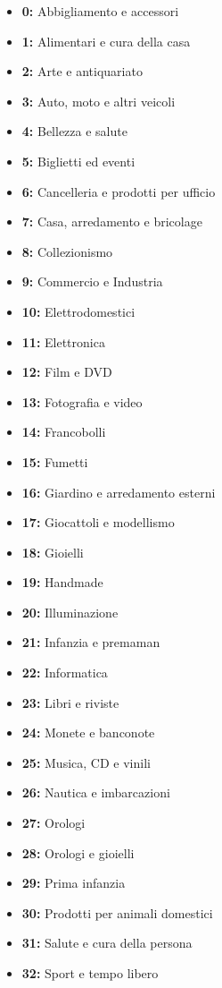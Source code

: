 \begin{itemize}

\item \textbf{0:} Abbigliamento e accessori
\item \textbf{1:} Alimentari e cura della casa
\item \textbf{2:} Arte e antiquariato
\item \textbf{3:} Auto, moto e altri veicoli
\item \textbf{4:} Bellezza e salute
\item \textbf{5:} Biglietti ed eventi
\item \textbf{6:} Cancelleria e prodotti per ufficio
\item \textbf{7:} Casa, arredamento e bricolage
\item \textbf{8:} Collezionismo
\item \textbf{9:} Commercio e Industria
\item \textbf{10:} Elettrodomestici
\item \textbf{11:} Elettronica
\item \textbf{12:} Film e DVD
\item \textbf{13:} Fotografia e video
\item \textbf{14:} Francobolli
\item \textbf{15:} Fumetti
\item \textbf{16:} Giardino e arredamento esterni
\item \textbf{17:} Giocattoli e modellismo
\item \textbf{18:} Gioielli
\item \textbf{19:} Handmade
\item \textbf{20:} Illuminazione
\item \textbf{21:} Infanzia e premaman
\item \textbf{22:} Informatica
\item \textbf{23:} Libri e riviste
\item \textbf{24:} Monete e banconote
\item \textbf{25:} Musica, CD e vinili
\item \textbf{26:} Nautica e imbarcazioni
\item \textbf{27:} Orologi
\item \textbf{28:} Orologi e gioielli
\item \textbf{29:} Prima infanzia
\item \textbf{30:} Prodotti per animali domestici
\item \textbf{31:} Salute e cura della persona
\item \textbf{32:} Sport e tempo libero

\end{itemize}
